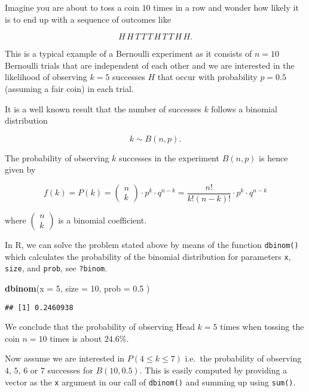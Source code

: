 \documentclass[]{book}
\newenvironment{Shaded}{\begin{snugshade}}{\end{snugshade}}
\newcommand{\KeywordTok}[1]{\textcolor[rgb]{0.13,0.29,0.53}{\textbf{#1}}}
\newcommand{\DataTypeTok}[1]{\textcolor[rgb]{0.13,0.29,0.53}{#1}}
\newcommand{\DecValTok}[1]{\textcolor[rgb]{0.00,0.00,0.81}{#1}}
\newcommand{\FloatTok}[1]{\textcolor[rgb]{0.00,0.00,0.81}{#1}}
\newcommand{\NormalTok}[1]{#1}
\theoremstyle{definition}
\theoremstyle{definition}
\theoremstyle{definition}
\theoremstyle{remark}
\begin{document}
Imagine you are about to toss a coin \(10\) times in a row and wonder
how likely it is to end up with a sequence of outcomes like

\[ H \, H \, T \, T \,T \,H \,T \,T \, H \, H .\]

This is a typical example of a Bernoulli experiment as it consists of
\(n=10\) Bernoulli trials that are independent of each other and we are
interested in the likelihood of observing \(k=5\) successes \(H\) that
occur with probability \(p=0.5\) (assuming a fair coin) in each trial.

It is a well known result that the number of successes \(k\) follows a
binomial distribution

\[ k \sim B(n,p). \]

The probability of observing \(k\) successes in the experiment
\(B(n,p)\) is hence given by

\[f(k)=P(k)=\begin{pmatrix}n\\ k \end{pmatrix} \cdot p^k \cdot
q^{n-k}=\frac{n!}{k!(n-k)!} \cdot p^k \cdot q^{n-k}\]

where \(\begin{pmatrix}n\\ k \end{pmatrix}\) is a binomial coefficient.

In R, we can solve the problem stated above by means of the function
\texttt{dbinom()} which calculates the probability of the binomial
distribution for parameters \texttt{x}, \texttt{size}, and
\texttt{prob}, see \texttt{?binom}.

\begin{Shaded}
\begin{Highlighting}[]
\KeywordTok{dbinom}\NormalTok{(}\DataTypeTok{x =} \DecValTok{5}\NormalTok{,}
       \DataTypeTok{size =} \DecValTok{10}\NormalTok{,}
       \DataTypeTok{prob =} \FloatTok{0.5}
\NormalTok{       ) }
\end{Highlighting}
\end{Shaded}

\begin{verbatim}
## [1] 0.2460938
\end{verbatim}

We conclude that the probability of observing Head \(k=5\) times when
tossing the coin \(n=10\) times is about \(24.6\%\).

Now assume we are interested in \(P(4 \leq k \leq 7)\) i.e.~the
probability of observing \(4\), \(5\), \(6\) or \(7\) successes for
\(B(10,0.5)\). This is easily computed by providing a vector as the
\texttt{x} argument in our call of \texttt{dbinom()} and summing up
using \texttt{sum()}.
\end{document}
